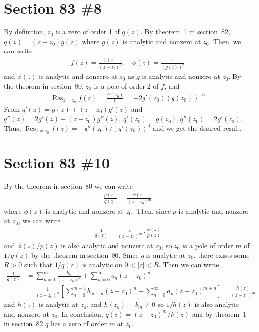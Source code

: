 \documentclass{scrartcl}
\DeclareMathOperator*{\Res}{Res}
\begin{document}
\section{Section 83 \#8}
By definition, \(z_0\) is a zero of order 1 of \(q(z)\).
By theorem~1 in section~82, \(q(z) = (z - z_0)g(z)\) where \(g(z)\) is analytic and nonzero at \(z_0\).
Then, we can write
\begin{align*}
  f(z) = \frac{\phi(z)}{(z - z_0)^2}, \quad \phi(z) = \frac{1}{(g(z))^2}
\end{align*}
and \(\phi(z)\) is analytic and nonzero at \(z_0\) as \(g\) is analytic and nonzero at \(z_0\).
By the theorem in section~80, \(z_0\) is a pole of order 2 of \(f\), and
\begin{align*}
  \Res_{z = z_0} f(z) = \frac{\phi'(z_0)}{1!} = -2g'(z_0)(g(z_0))^{-3}
\end{align*}
From \(q'(z) = g(z) + (z - z_0)g'(z)\) and \(q''(z) = 2g'(z) + (z - z_0)g''(z)\), \(q'(z_0) = g(z_0), q''(z_0) = 2g'(z_0)\).
Thus, \(\Res_{z = z_0} f(z) = -q''(z_0) / (q'(z_0))^3\) and we get the desired result.

\section{Section 83 \#10}
By the theorem in section~80 we can write
\begin{align*}
  \frac{p(z)}{q(z)} = \frac{\phi(z)}{(z - z_0)^m}
\end{align*}
where \(\phi(z)\) is analytic and nonzero at \(z_0\).
Then, since \(p\) is analytic and nonzero at \(z_0\), we can write
\begin{align*}
  \frac{1}{q(z)} = \frac{1}{(z - z_0)^m} \cdot \frac{\phi(z)}{p(z)}
\end{align*}
and \(\phi(z) / p(z)\) is also analytic and nonzero at \(z_0\), so \(z_0\) is a pole of order \(m\) of \(1 / q(z)\) by the theorem in section~80.
Since \(q\) is analytic at \(z_0\), there exists some \(R > 0\) such that \(1 / q(z)\) is analytic on \(0 < |z| < R\).
Then we can write
\begin{align*}
  \frac{1}{q(z)}
  &= \sum^m_{n = 1} \frac{b_n}{(z - z_0)^n} + \sum^\infty_{n = 0} a_n (z - z_0)^n \\
  &= \frac{1}{(z - z_0)^m} \left[ \sum^{m - 1}_{n = 0} b_{m - n} (z - z_0)^n + \sum^\infty_{n = 0} a_n (z - z_0)^{m + n} \right]
  = \frac{h(z)}{(z - z_0)^m}
\end{align*}
and \(h(z)\) is analytic at \(z_0\), and \(h(z_0) = b_m \not = 0\) so \(1 / h(z)\) is also analytic and nonzero at \(z_0\).
In conclusion, \(q(z) = (z - z_0)^m / h(z)\) and by theorem~1 in section~82 \(q\) has a zero of order \(m\) at \(z_0\).
\end{document}
